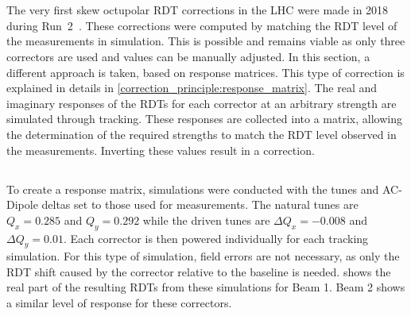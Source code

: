 \section{}

The very first skew octupolar RDT corrections in the LHC were made in 2018 during
Run~2~\cite{carlier_nonlinear_2020}. These corrections were computed by matching the RDT level of
the measurements in simulation. This is possible and remains viable as only three correctors are
used and values can be manually adjusted.
In this section, a different approach is taken, based on response matrices. This type of correction
is explained in details in \cref{correction_principle:response_matrix}. The real and imaginary 
responses of the RDTs for each corrector at an arbitrary strength are simulated through tracking.
These responses are collected into a matrix, allowing the determination of the required strengths to
match the RDT level observed in the measurements. Inverting these values result in a correction.


\subsection{}

To create a response matrix, simulations were conducted with the tunes and AC-Dipole deltas set to
those used for measurements. The natural tunes are $Q_x = 0.285$ and $Q_y = 0.292$ while the driven
tunes are $\Delta Q_x = -0.008$ and $\Delta Q_y = 0.01$. Each corrector is then powered
individually for each tracking simulation. For this type of simulation, field errors are not
necessary, as only the RDT shift caused by the corrector relative to the baseline is needed.
 shows the real part of the resulting RDTs from these
simulations for Beam 1. Beam 2 shows a similar level of response for these correctors.

